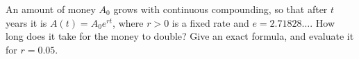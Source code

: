 An amount of money $A_0$ grows with continuous compounding, so that after $t$ years it is $A(t)=A_0e^{rt}$, where $r>0$ is a fixed rate and $e=2.71828\ldots$. How long does it take for the money to double? Give an exact formula, and evaluate it for $r=0.05$.
